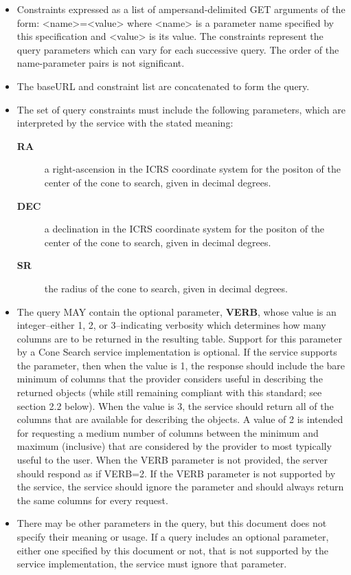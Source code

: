 \documentclass[11pt,a4paper]{ivoa}
\begin{document}
\begin{enumerate}
\begin{itemize}
		\item Constraints expressed as a list of
			ampersand-delimited GET arguments of the form: <name>=<value> where
			<name> is a parameter name specified by this specification and <value>
			is its value. The constraints represent the query parameters which can
			vary for each successive query. The order of the name-parameter pairs is
			not significant.
		\item The baseURL and constraint list are concatenated
			to form the query. 
		\item The set of query constraints must include the
			following parameters, which are interpreted by the service with the
			stated meaning: 
			\begin{description}
				\item[\textbf{RA}] a right-ascension
					in the ICRS coordinate system for the positon of the center of the cone
					to search, given in decimal degrees.
				\item[\textbf{DEC}] a declination
					in the ICRS coordinate system for the positon of the center of the cone
					to search, given in decimal degrees.
				\item[\textbf{SR}] the radius of
					the cone to search, given in decimal degrees.
			\end{description}
		\item The query MAY contain the optional parameter,
			\textbf{VERB}, whose value is an integer--either 1, 2, or 3--indicating
			verbosity which determines how many columns are to be returned in the
			resulting table. Support for this parameter by a Cone Search service
			implementation is optional. If the service supports the parameter, then
			when the value is 1, the response should include the bare minimum of
			columns that the provider considers useful in describing the returned
			objects (while still remaining compliant with this standard; see section
			2.2 below). When the value is 3, the service should return all of the
			columns that are available for describing the objects. A value of 2 is
			intended for requesting a medium number of columns between the minimum
			and maximum (inclusive) that are considered by the provider to most
			typically useful to the user. When the VERB parameter is not provided,
			the server should respond as if VERB=2. If the VERB parameter is not
			supported by the service, the service should ignore the parameter and
			should always return the same columns for every request.
		\item There may be other parameters in the query, but this document does not
			specify their meaning or usage. If a query includes an optional parameter,
			either one specified by this document or not, that is not supported by
			the service implementation, the service must ignore that parameter.
	\end{itemize}
	

\end{enumerate}
\end{document}
